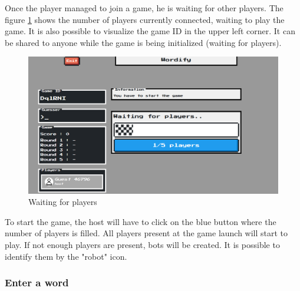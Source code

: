 \documentclass{tnreport}
\begin{document}
Once the player managed to join a game, he is waiting for other players. The figure \ref{fig:waiting_players} shows the number of players currently connected, waiting to play the game. It is also possible to visualize the game ID in the upper left corner. It can be shared to anyone while the game is being initialized (waiting for players). 

\vspace*{0.1cm}

\begin{figure}[ht]
	\centering
	\fboxsep=1.2pt
	\includegraphics[scale=0.52]{figures/waiting_players}
	\caption{Waiting for players}
	\label{fig:waiting_players}
\end{figure} 

To start the game, the host will have to click on the blue button where the number of players is filled. All players present at the game launch will start to play. If not enough players are present, bots will be created. It is possible to identify them by the "robot" icon. 

\subsubsection{Enter a word}
\end{document}
